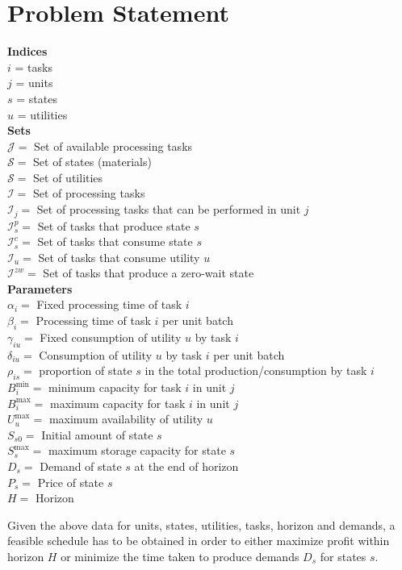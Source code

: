 \chapter{Problem Statement}
\thispagestyle{plain}


\textbf{Indices} \\
$i$ = tasks \\
$j$ = units  \\
$s$ = states  \\
$u$ = utilities \\
\textbf{Sets} \\
$\mathcal{J} = $ Set of available processing tasks \\
$\mathcal{S} = $ Set of states (materials) \\
$\mathcal{S} = $ Set of utilities \\
$\mathcal{I} = $ Set of processing tasks \\
$\mathcal{I}_j = $ Set of processing tasks that can be performed in unit $j$\\
$\mathcal{I}_s^p = $ Set of tasks that produce state $s$\\
$\mathcal{I}_s^c = $ Set of tasks that consume state $s$\\
$\mathcal{I}_u = $ Set of tasks that consume utility $u$\\
$\mathcal{I}^{zw} = $ Set of tasks that produce a zero-wait state \\
\textbf{Parameters} \\
$\alpha_i = $ Fixed processing time of task $i$ \\
$\beta_i = $ Processing time of task $i$ per unit batch \\
$\gamma_{iu} = $ Fixed consumption of utility $u$ by task $i$ \\
$\delta_{iu} = $ Consumption of utility $u$ by task $i$ per unit batch \\
$\rho_{is} = $ proportion of state $s$ in the total production/consumption by task $i$ \\
$B_i^{\text{min}} = $ minimum capacity for task $i$ in unit $j$ \\
$B_i^{\text{max}} = $ maximum capacity for task $i$ in unit $j$ \\
$U_u^{\text{max}} = $ maximum availability of utility $u$ \\
$S_{s0} = $ Initial amount of state $s$ \\
$S_{s}^{\text{max}} = $ maximum storage capacity for state $s$ \\
$D_s = $ Demand of state $s$ at the end of horizon \\
$P_s = $ Price of state $s$ \\
$H = $ Horizon

Given the above data for units, states, utilities, tasks, horizon and demands, a feasible schedule has to be obtained in order to either maximize profit within horizon $H$ or minimize the time taken to produce demands $D_s$ for states $s$.

